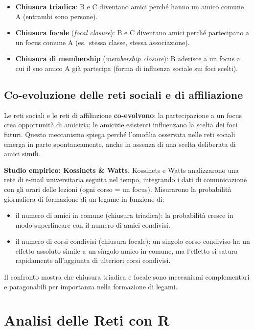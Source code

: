 \documentclass[12pt,a4paper]{article}
\begin{document}
\begin{itemize}
  \item \textbf{Chiusura triadica}: B e C diventano amici perché hanno un amico comune A
        (entrambi sono persone).
  \item \textbf{Chiusura focale} (\textit{focal closure}): B e C diventano amici perché
        partecipano a un focus comune A (es.\ stessa classe, stessa associazione).
  \item \textbf{Chiusura di membership} (\textit{membership closure}): B aderisce a un focus
        a cui il suo amico A già partecipa (forma di influenza sociale sui foci scelti).
\end{itemize}

\subsection{Co-evoluzione delle reti sociali e di affiliazione}

Le reti sociali e le reti di affiliazione \textbf{co-evolvono}: la partecipazione a un focus
crea opportunità di amicizia; le amicizie esistenti influenzano la scelta dei foci futuri.
Questo meccanismo spiega perché l'omofilia osservata nelle reti sociali emerga in parte
spontaneamente, anche in assenza di una scelta deliberata di amici simili.

\medskip
\noindent\textbf{Studio empirico: Kossinets \& Watts.}
Kossinets e Watts analizzarono una rete di e-mail universitaria seguita nel tempo,
integrando i dati di comunicazione con gli orari delle lezioni (ogni corso = un focus).
Misurarono la probabilità giornaliera di formazione di un legame in funzione di:
\begin{itemize}
  \item il numero di amici in comune (chiusura triadica): la probabilità cresce in modo
        superlineare con il numero di amici condivisi.
  \item il numero di corsi condivisi (chiusura focale): un singolo corso condiviso ha
        un effetto assoluto simile a un singolo amico in comune, ma l'effetto si satura
        rapidamente all'aggiunta di ulteriori corsi condivisi.
\end{itemize}
Il confronto mostra che chiusura triadica e focale sono meccanismi complementari e
paragonabili per importanza nella formazione di legami.

\section{Analisi delle Reti con R}
\end{document}
